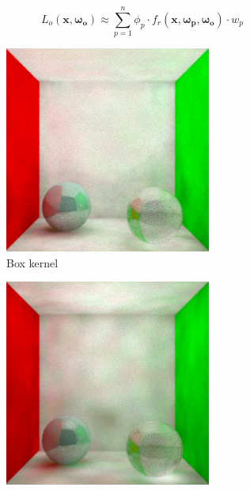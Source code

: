 \documentclass{article}
\begin{document}
\begin{equation}
L_o(\mathbf{x}, \mathbf{\omega_{o}}) \approx \sum_{p=1}^{n} \phi_{p} \cdot f_r(\mathbf{x}, \mathbf{\omega_{p}}, \mathbf{\omega_{o}}) \cdot w_p
\end{equation}


\begin{figure}
\begin{subfigure}[h]{0.32\linewidth}
\includegraphics[width=\linewidth]{imgs/box.png}
\caption{Box kernel}
\end{subfigure}
\hfill
\begin{subfigure}[h]{0.32\linewidth}
\includegraphics[width=\linewidth]{imgs/cone1.png}

\end{subfigure}
\end{figure}
\end{document}
